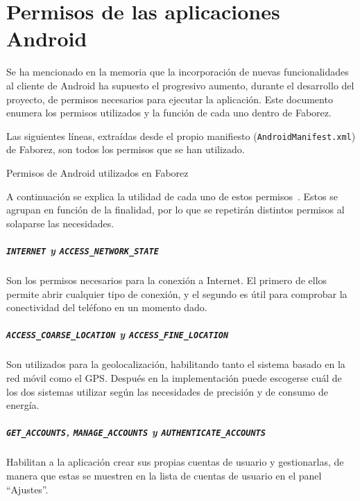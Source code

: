 \documentclass[main]{subfiles}
\begin{document}
\chapter{Permisos de las aplicaciones Android}
\label{sec:faborez-permissions}

Se ha mencionado en la memoria que la incorporación de nuevas funcionalidades al cliente de Android ha supuesto el progresivo aumento, durante el desarrollo del proyecto, de permisos necesarios para ejecutar la aplicación. Este documento enumera los permisos utilizados y la función de cada uno dentro de Faborez.

Las siguientes líneas, extraídas desde el propio manifiesto (\texttt{AndroidManifest.xml}) de Faborez, son todos los permisos que se han utilizado.

\begin{listing}
  \caption{Permisos de Android utilizados en Faborez}
  \label{lst:faborez-manifest}
\end{listing}

A continuación se explica la utilidad de cada uno de estos permisos~\autocite{android-permissions}. Estos se agrupan en función de la finalidad, por lo que se repetirán distintos permisos al solaparse las necesidades.

\paragraph{\texttt{INTERNET} y \texttt{ACCESS_NETWORK_STATE}} Son los permisos necesarios para la conexión a Internet. El primero de ellos permite abrir cualquier tipo de conexión, y el segundo es útil para comprobar la conectividad del teléfono en un momento dado.

\paragraph{\texttt{ACCESS_COARSE_LOCATION} y \texttt{ACCESS_FINE_LOCATION}} Son utilizados para la geolocalización, habilitando tanto el sistema basado en la red móvil como el GPS. Después en la implementación puede escogerse cuál de los dos sistemas utilizar según las necesidades de precisión y de consumo de energía.

\paragraph{\texttt{GET_ACCOUNTS}, \texttt{MANAGE_ACCOUNTS} y \texttt{AUTHENTICATE_ACCOUNTS}} Habilitan a la aplicación crear sus propias cuentas de usuario y gestionarlas, de manera que estas se muestren en la lista de cuentas de usuario en el panel \enquote{Ajustes}.
\end{document}
